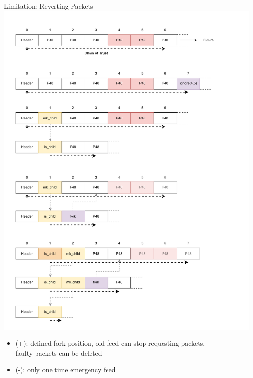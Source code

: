 \documentclass[aspectratio=169]{beamer}
\begin{document}
\begin{frame}[c]{Limitation: Reverting Packets}
        \includegraphics[width=1\textwidth]{images/fork_4.pdf}
        \begin{itemize}
        		\item (+): defined fork position, old feed can stop requesting packets, \\faulty packets can be deleted
		\item (-): only one time emergency feed
	\end{itemize}
\end{frame}
\end{document}
